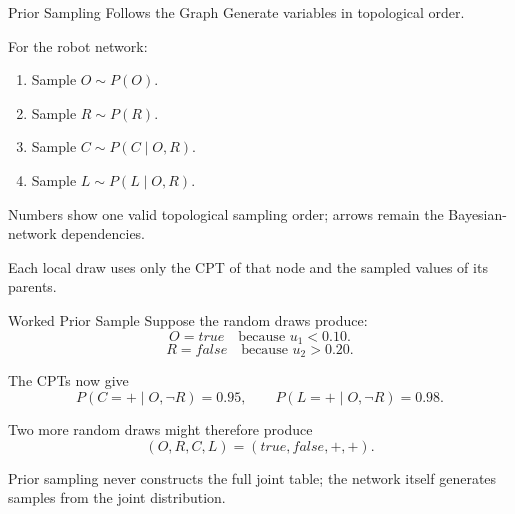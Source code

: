 \documentclass[aspectratio=169,10pt]{beamer}
\begin{document}
\begin{frame}[shrink=10]{Prior Sampling Follows the Graph}
  Generate variables in topological order.

  For the robot network:
  \begin{enumerate}
    \item Sample $O\sim P(O)$.
    \item Sample $R\sim P(R)$.
    \item Sample $C\sim P(C\mid O,R)$.
    \item Sample $L\sim P(L\mid O,R)$.
  \end{enumerate}

  \begin{center}
  \end{center}

  Numbers show one valid topological sampling order; arrows remain the Bayesian-network dependencies.

  \begin{keyidea}
    Each local draw uses only the CPT of that node and the sampled values of its parents.
  \end{keyidea}
\end{frame}

\begin{frame}[shrink=10]{Worked Prior Sample}
  Suppose the random draws produce:
  \[
    O=true \quad \text{because } u_1 < 0.10.
  \]
  \[
    R=false \quad \text{because } u_2 > 0.20.
  \]

  The CPTs now give
  \[
    P(C=+\mid O,\neg R)=0.95,
    \qquad
    P(L=+\mid O,\neg R)=0.98.
  \]

  Two more random draws might therefore produce
  \[
    (O,R,C,L)=(true,false,+,+).
  \]

  \begin{keyidea}
    Prior sampling never constructs the full joint table; the network itself generates samples from the joint distribution.
  \end{keyidea}
\end{frame}
\end{document}
